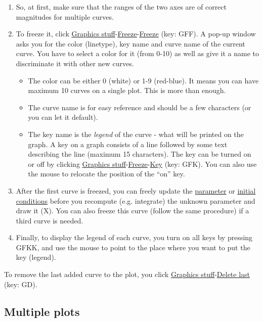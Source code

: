 \begin{enumerate}
\item So, at first, make sure that the ranges of the two axes are of
  correct magnitudes for multiple curves.

\item To freeze it, click
  \underline{Graphics stuff}-\underline{Freeze}-\underline{Freeze}
  (key: GFF). A pop-up window asks you for the color (linetype), key
  name and curve name of the current curve. You have to select a color
  for it (from 0-10) as well as give it a name to discriminate it with
  other new curves.

\begin{itemize}
\item The color can be either  0 (white) or 1-9 (red-blue). It means
  you can have maximum 10 curves on a single plot. This is more than
  enough. 

\item The curve name is for easy reference and should be a few
  characters (or you can let it default).

\item The key name is the {\it legend} of the curve - what will be
  printed on the graph. A key on a graph consists of a line followed
  by some text describing the line (maximum 15 characters). The key
  can be turned on or off by clicking
  \underline{Graphics stuff}-\underline{Freeze}-\underline{Key} (key:
  GFK). You can also use the mouse to relocate the position of the
  ``on'' key.
\end{itemize}

\item After the first curve is freezed, you can freely update the
  \hyperref[sec:parameters]{parameter} or
  \hyperref[sec:initial-values]{initial conditions} before you
  recompute (e.g. integrate) the unknown parameter and draw it
  (X). You can also freeze this curve (follow the same procedure) if a
  third curve is needed.

\item Finally, to display the legend of each curve, you turn on all
  keys by pressing GFKK, and use the mouse to point to the place where
  you want to put the key (legend).

\end{enumerate}

To remove the last added curve to the plot, you click
\underline{Graphics stuff}-\underline{Delete last} (key: GD).


\subsection{Multiple plots}
\label{sec:many-plots}

